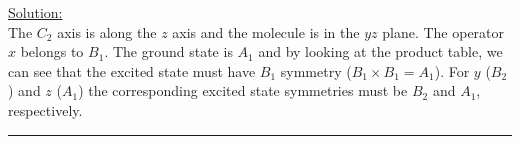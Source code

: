 \noindent
\underline{Solution:}\\

\noindent
The $C_2$ axis is along the $z$ axis and the molecule is in the $yz$ plane. The operator $x$ belongs to $B_1$. The ground state
is $A_1$ and by looking at the product table, we can see that the excited state must have $B_1$ symmetry ($B_1\times B_1 = A_1$).
For $y$ ($B_2$) and $z$ ($A_1$) the corresponding excited state symmetries must be $B_2$ and $A_1$, respectively.\\

\hrule\vspace{0.5cm}
